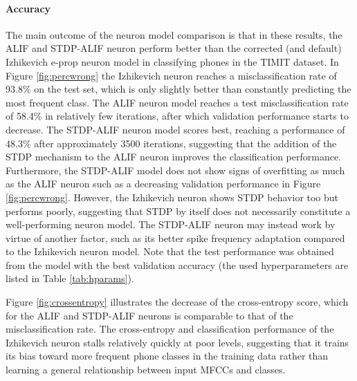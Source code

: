 		\paragraph{Accuracy}
			The main outcome of the neuron model comparison is that in these results, the ALIF and STDP-ALIF neuron perform better than the corrected (and default) Izhikevich e-prop neuron model in classifying phones in the TIMIT dataset.
			In Figure \ref{fig:percwrong} the Izhikevich neuron reaches a misclassification rate of 93.8\% on the test set, which is only slightly better than constantly predicting the most frequent class.
			The ALIF neuron model reaches a test misclassification rate of 58.4\% in relatively few iterations, after which validation performance starts to decrease.
			The STDP-ALIF neuron model scores best, reaching a performance of 48.3\% after approximately 3500 iterations, suggesting that the addition of the STDP mechanism to the ALIF neuron improves the classification performance.
			Furthermore, the STDP-ALIF model does not show signs of overfitting as much as the ALIF neuron such as a decreasing validation performance in Figure \ref{fig:percwrong}.
			However, the Izhikevich neuron shows STDP behavior too but performs poorly, suggesting that STDP by itself does not necessarily constitute a well-performing neuron model.
			The STDP-ALIF neuron may instead work by virtue of another factor, such as its better spike frequency adaptation compared to the Izhikevich neuron model.
			Note that the test performance was obtained from the model with the best validation accuracy (the used hyperparameters are listed in Table \ref{tab:hparams}).

			Figure \ref{fig:crossentropy} illustrates the decrease of the cross-entropy score, which for the ALIF and STDP-ALIF neurons is comparable to that of the misclassification rate.
			The cross-entropy and classification performance of the Izhikevich neuron stalls relatively quickly at poor levels, suggesting that it trains its bias toward more frequent phone classes in the training data rather than learning a general relationship between input MFCCs and classes.

